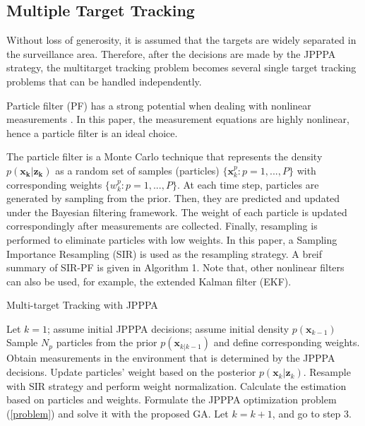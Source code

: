 \documentclass[12pt,journal,draftclsnofoot,onecolumn]{IEEEtran}
\begin{document}
\subsection{Multiple Target Tracking}
Without loss of generosity, it is assumed that the targets are widely separated in the surveillance area. Therefore, after the decisions are made by the JPPPA strategy, the multitarget tracking problem becomes several single target tracking problems that can be handled independently.

Particle filter (PF) has a strong potential when dealing with nonlinear measurements \cite{arulampalam2002tutorial}. In this paper, the measurement equations are highly nonlinear, hence a particle filter is an ideal choice.

The particle filter is a Monte Carlo technique that represents the density $p(\mathbf{x_k|z_k})$ as a random set of samples (particles) $\lbrace \mathbf{x}_k^p:p=1,...,P \rbrace$ with corresponding weights  $\lbrace w_k^p:p=1,...,P\rbrace$. At each time step, particles are generated by sampling from the prior. Then, they are predicted and updated under the Bayesian filtering framework. The weight of each particle is updated correspondingly after measurements are collected. Finally, resampling is performed to eliminate particles with low weights. In this paper, a Sampling Importance Resampling (SIR) is used as the resampling strategy. A breif summary of SIR-PF is given in Algorithm 1. Note that, other nonlinear filters can also be used, for example, the extended Kalman filter (EKF)\cite{bar2004estimation}. 



\begin{algorithm}
\caption{Multi-target Tracking with JPPPA} 
\label{alg:Framwork} 
\begin{algorithmic}[1]
\STATE Let $k=1$; assume initial JPPPA decisions; assume initial density $p(\mathbf{x}_{k-1})$
\STATE Sample $N_p$ particles from the prior $p(\mathbf{x}_{k|k-1})$ and define corresponding weights.
\STATE Obtain measurements in the environment that is determined by the JPPPA decisions.
\STATE Update particles' weight based on the posterior $p(\mathbf{x}_k|\mathbf{z}_k)$.
\STATE Resample with SIR strategy and perform weight normalization.
\STATE Calculate the estimation based on particles and weights.
\ENDFOR
\STATE Formulate the JPPPA optimization problem (\ref{problem}) and solve it with the proposed GA.
\STATE Let $k=k+1$, and go to step 3.
\end{algorithmic}
\end{algorithm}
\end{document}
